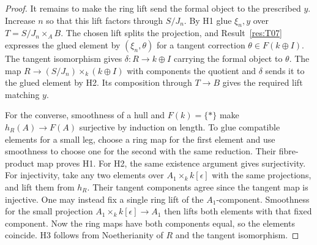 \begin{proof}
It remains to make the ring lift send the formal object to the
prescribed \(y\). Increase \(n\) so that this lift factors through
\(S/J_n\). By H1 glue \(\xi_n,y\) over \(T=S/J_n\times_A B\).
The chosen lift splits the projection, and Result~\ref{res:T07}
expresses the glued element by \((\xi_n,\theta)\) for a tangent
correction \(\theta\in F(k\oplus I)\). The tangent isomorphism
gives \(\delta:R\to k\oplus I\) carrying the formal object to
\(\theta\). The map \(R\to (S/J_n)\times_k(k\oplus I)\) with
components the quotient and \(\delta\) sends it to the glued
element by H2. Its composition through \(T\to B\) gives the
required lift matching \(y\).

For the converse, smoothness of a hull and \(F(k)=\{*\}\) make
\(h_R(A)\to F(A)\) surjective by induction on length.
To glue compatible elements for a small leg, choose a ring map
for the first element and use smoothness to choose one for the
second with the same reduction. Their fibre-product map proves H1.
For H2, the same existence argument gives surjectivity. For
injectivity, take any two elements over \(A_1\times_k k[\epsilon]\)
with the same projections, and lift them from \(h_R\).
Their tangent components agree since the tangent map is injective.
One may instead fix a single ring lift of the \(A_1\)-component.
Smoothness for the small projection
\(A_1\times_k k[\epsilon]\to A_1\) then lifts both elements with
that fixed component. Now the ring maps have both components
equal, so the elements coincide. H3 follows from Noetherianity
of \(R\) and the tangent isomorphism.
\end{proof}

